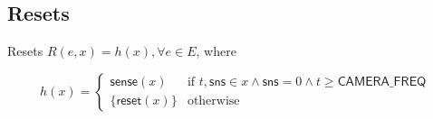 \documentclass[12pt]{article}
\theoremstyle{definition}
\begin{document}
\subsection{Resets}

Resets $ R(e,x) = h(x), \forall e \in E$, where 

\[
    h(x) = 
    \begin{cases}
        \mathsf{sense}(x) & \text{if } t,\mathsf{sns} \in x \land \mathsf{sns} = 0 \land t \ge \mathsf{CAMERA\_FREQ} \\
        \{\mathsf{reset}(x)\} & \text{otherwise}
    \end{cases}
\]
\end{document}
